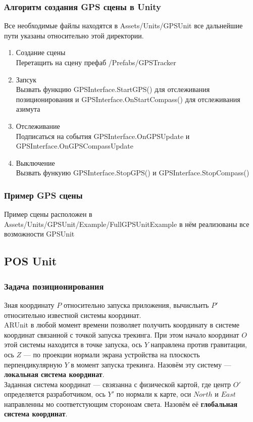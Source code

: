 \documentclass[a4paper, 11pt, titlepage]{article}
\begin{document}
    \subsubsection{Алгоритм создания GPS сцены в Unity}
      Все необходимые файлы находятся в Assets/Units/GPSUnit все дальнейшие пути указаны относительно этой директории.
      \begin{enumerate}
        \item Создание сцены \\
        Перетащить на сцену префаб /Prefabs/GPSTracker
        \item Запсук \\
        Вызвать функцию GPSInterface.StartGPS() для отслеживания позиционирования и GPSInterface.OnStartCompass() для отслеживания
        азимута
        \item Отслеживание \\
        Подписаться на события GPSInterface.OnGPSUpdate и GPSInterface.OnGPSCompassUpdate
        \item Выключение \\
        Вызвать функуию GPSInterface.StopGPS() и GPSInterface.StopCompass()
      \end{enumerate}

    \subsubsection{Пример GPS сцены}
      Пример сцены расположен в Assets/Units/GPSUnit/Example/FullGPSUnitExample в нём реализованы все возможности GPSUnit

    \subsection{POS Unit}
      \subsubsection{Задача позиционирования}
        Зная координату $P$ относительно запуска приложения, вычисльить $P'$ относительно известной системы координат. \\
        ARUnit в любой момент времени позволяет получить координату в системе координат связанной с точкой запуска трекинга. 
        При этом начало координат $O$ этой системы находится в точке запуска, ось $Y$ направлена против гравитации, ось $Z$ --- по 
        проекции нормали экрана устройства на плоскость перпендикулярную $Y$ в момент запуска трекинга. Назовём эту систему --- \textbf{локальная система координат}. \\
        Заданная система координат --- свзязанна с физической картой, где центр $O'$ определяется разработчиком, ось $Y'$ по нормали к карте, оси $North$ и $East$ направленны мо
        соответстующим стороноам света. Назовём её \textbf{глобальная система координат}.
\end{document}
